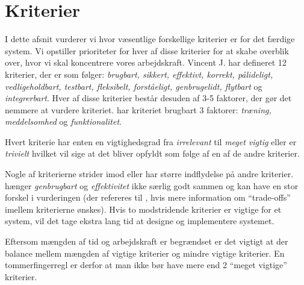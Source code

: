 \section{Kriterier}
\label{sec:kriterier}

I dette afsnit vurderer vi hvor væsentlige forskellige kriterier er for det færdige system. Vi opstiller prioriteter for hver af disse kriterier for at skabe overblik over, hvor vi skal koncentrere vores arbejdskraft. Vincent J. har defineret 12 kriterier\cite{crit}, der er som følger: \emph{brugbart, sikkert, effektivt, korrekt, pålideligt, vedligeholdbart, testbart, fleksibelt, forståeligt, genbrugelidt, flytbart} og \emph{integrerbart}. Hver af disse kriterier består desuden af 3-5 faktorer, der gør det nemmere at vurdere kriteriet. \Fx har kriteriet brugbart 3 faktorer: \emph{træning, meddelsomhed} og \emph{funktionalitet}.

Hvert kriterie har enten en vigtighedsgrad fra \emph{irrelevant} til \emph{meget vigtig} eller er \emph{trivielt} hvilket vil sige at det bliver opfyldt som følge af en af de andre kriterier.
 
Nogle af kriterierne strider imod eller har større indflydelse på andre kriterier. \Fx hænger \emph{genbrugbart} og \emph{effektivitet} ikke særlig godt sammen og kan have en stor forskel i vurderingen (der refereres til \cite[s.~18]{crit}, hvis mere information om ``trade-offs'' imellem kriterierne ønskes). Hvis to modstridende kriterier er vigtige for et system, vil det tage ekstra lang tid at designe og implementere systemet.

Eftersom mængden af tid og arbejdskraft er begrændset er det vigtigt at der balance mellem mængden af vigtige kriterier og mindre vigtige kriterier. En tommerfingerregl er derfor at man ikke bør have mere end 2 ``meget vigtige'' kriterier.






